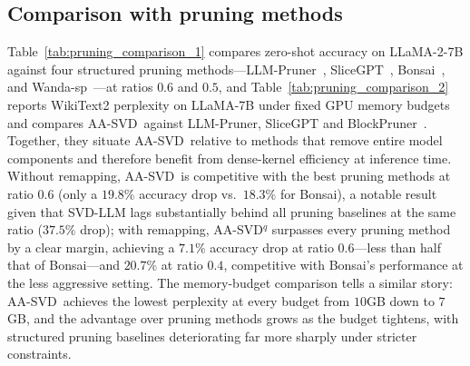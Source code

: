 \documentclass[10pt]{article} %
\theoremstyle{definition}
\theoremstyle{remark}
\newcommand{\ourmethod}{{\textsc{AA-SVD}}}
\newcommand{\ourmethodlight}{{\textsc{AA-SVD}}}
\begin{document}
\subsection{Comparison with pruning methods}
% 
Table~\ref{tab:pruning_comparison_1} compares zero-shot accuracy on LLaMA-2-7B against four structured pruning methods---LLM-Pruner~\citep{ma2023llm}, SliceGPT~\citep{ashkboos2024slicegpt}, Bonsai~\citep{kolawole2024everybody}, and Wanda-sp~\citep{sun2023simple}---at ratios $0.6$ and $0.5$, and Table~\ref{tab:pruning_comparison_2} reports WikiText2 perplexity on LLaMA-7B under fixed GPU memory budgets and compares \ourmethod~against LLM-Pruner, SliceGPT and BlockPruner~\citep{zhong2025blockpruner}. Together, they situate \ourmethodlight~relative to methods that remove entire model components and therefore benefit from dense-kernel efficiency at inference time.
Without remapping, \ourmethodlight~is competitive with the best pruning methods at ratio $0.6$ (only a $19.8\%$ accuracy drop vs.\ $18.3\%$ for Bonsai), a notable result given that SVD-LLM lags substantially behind all pruning baselines at the same ratio ($37.5\%$ drop); with remapping, \ourmethodlight$^q$ surpasses every pruning method by a clear margin, achieving a $7.1\%$ accuracy drop at ratio $0.6$---less than half that of Bonsai---and $20.7\%$ at ratio $0.4$, competitive with Bonsai's performance at the less aggressive setting.
The memory-budget comparison tells a similar story: \ourmethodlight~achieves the lowest perplexity at every budget from $10$GB down to $7$GB, and the advantage over pruning methods grows as the budget tightens, with structured pruning baselines deteriorating far more sharply under stricter constraints.
\end{document}
